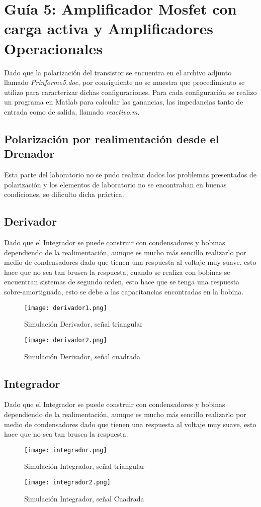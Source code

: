 \documentclass[11pt,graphicx,caption,rotating]{article}
\begin{document}
\section{Guía 5: Amplificador Mosfet con carga activa y Amplificadores Operacionales}
\noindent
Dado que la polarización del transistor se encuentra en el archivo adjunto llamado \textit{Prinforme5.doc}, por consiguiente no se muestra que procedimiento se utilizo para caracterizar dichas configuraciones. Para cada configuración se realizo un programa en Matlab para calcular las ganancias, las impedancias tanto de entrada como de salida, llamado \textit{reactivo.m}.\\

\subsection{Polarización por realimentación desde el Drenador}
\noindent
Esta parte del laboratorio no se pudo realizar dados los problemas presentados de polarización y los elementos de laboratorio no se encontraban en buenas condiciones, se dificulto dicha práctica.

\subsection{Derivador}
\noindent
Dado que el Integrador se puede construir con condensadores y bobinas dependiendo de la realimentación, aunque es mucho más sencillo realizarlo por medio de condensadores dado que tienen una respuesta al voltaje muy suave, esto hace que no sea tan brusca la respuesta, cuando se realiza con bobinas se encuentran sistemas de segundo orden, esto hace que se tenga una respuesta sobre-amortiguada, esto se debe a las capacitancias encontradas en la bobina.
\begin{figure}[H]
	\centering
		\texttt{[image: derivador1.png]}
	\caption{Simulación Derivador, señal triangular}
	\label{fig4}
\end{figure}
\begin{figure}[H]
	\centering
		\texttt{[image: derivador2.png]}
	\caption{Simulación Derivador, señal cuadrada}
	\label{fig5}
\end{figure}

\subsection{Integrador}
\noindent
Dado que el Integrador se puede construir con condensadores y bobinas dependiendo de la realimentación, aunque es mucho más sencillo realizarlo por medio de condensadores dado que tienen una respuesta al voltaje muy suave, esto hace que no sea tan brusca la respuesta.
\begin{figure}[H]
	\centering
		\texttt{[image: integrador.png]}
	\caption{Simulación Integrador, señal triangular}
	\label{fig6}
\end{figure}
\begin{figure}[H]
	\centering
		\texttt{[image: integrador2.png]}
	\caption{Simulación Integrador, señal Cuadrada}
	\label{fig6}
\end{figure}
\end{document}
